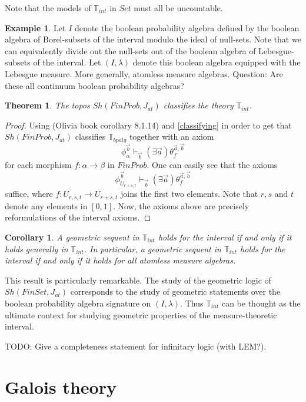 \documentclass[a4paper]{amsproc}
\theoremstyle{plain}
\newtheorem{theorem}{Theorem}[section]
\newtheorem{corollary}{Corollary}[section]
\theoremstyle{definition}
\newtheorem{example}{Example}[section]
\theoremstyle{remark}
\numberwithin{equation}{section}
\begin{document}
Note that the models of $\mathbb{T}_{int}$ in $Set$ must all be uncountable.

\begin{example}
Let $I$ denote the boolean probability algebra defined by the boolean algebra of Borel-subsets of the interval modulo the ideal of null-sets. Note that we can equivalently divide out the null-sets out of the boolean algebra of Lebesgue-subsets of the interval. Let $(I, \lambda)$ denote this boolean algebra equipped with the Lebesgue measure.
More generally, atomless measure algebras. Question: Are these all continuum boolean probability algebras?
\end{example}

\begin{theorem}
The topos $Sh(FinProb,J_{at})$ classifies the theory $\mathbb{T}_{int}$.
\end{theorem}
\begin{proof}
Using (Olivia book corollary 8.1.14) and \ref{classifying} in order to get that $Sh(FinProb,J_{at})$ classifies $\mathbb{T}_{bpalg}$ together with an axiom
\[
\phi_{\alpha}^{\vec{b}} \vdash_{\vec{b}} (\exists \vec{a}) \theta_f^{\vec{a},\vec{b}}
\]
for each morphism $f: \alpha \to \beta$ in $FinProb$. One can easily see that the axioms
\[
\phi_{U_{r+s,t}}^{\vec{b}} \vdash_{\vec{b}} (\exists \vec{a}) \theta_f^{\vec{a},\vec{b}}
\]
suffice, where $f: U_{r,s,t} \to U_{r+s,t}$ joins the first two elements. Note that $r,s$ and $t$ denote any elements in $[0,1]$. Now, the axioms above are precisely reformulations of the interval axioms.
\end{proof}

\begin{corollary}
A geometric sequent in $\mathbb{T}_{int}$ holds for the interval if and only if it holds generally in $\mathbb{T}_{int}$. In particular, a geometric sequent in $\mathbb{T}_{int}$ holds for the interval if and only if it holds for all atomless measure algebras.
\end{corollary}

This result is particularly remarkable. The study of the geometric logic of $Sh(FinSet, J_{at})$ corresponds to the study of geometric statements over the boolean probability algebra signature on $(I, \lambda)$. Thus $\mathbb{T}_{int}$ can be thought as the ultimate context for studying geometric properties of the measure-theoretic interval.

TODO: Give a completeness statement for infinitary logic (with LEM?).

\section{Galois theory}
\end{document}
